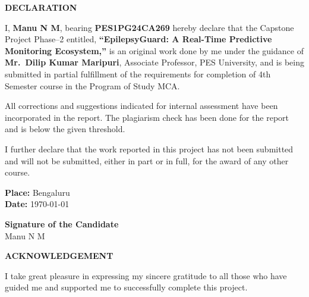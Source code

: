 \documentclass[12pt, a4paper, oneside]{report}
\begin{document}
\newpage
\begin{center}
    {\Large \textbf{DECLARATION} \par}
    \vspace{1.5cm}
\end{center}
\noindent I, \textbf{Manu N M}, bearing \textbf{PES1PG24CA269} hereby declare that the Capstone Project Phase--2 entitled, \textbf{``EpilepsyGuard: A Real-Time Predictive Monitoring Ecosystem,''} is an original work done by me under the guidance of \textbf{Mr.\ Dilip Kumar Maripuri}, Associate Professor, PES University, and is being submitted in partial fulfillment of the requirements for completion of 4th Semester course in the Program of Study MCA.

\vspace{0.8cm}
\noindent All corrections and suggestions indicated for internal assessment have been incorporated in the report. The plagiarism check has been done for the report and is below the given threshold.

\vspace{0.8cm}
\noindent I further declare that the work reported in this project has not been submitted and will not be submitted, either in part or in full, for the award of any other course.

\vspace{3cm}
\noindent
\begin{minipage}[t]{0.5\textwidth}
    \textbf{Place:} Bengaluru \\
    \textbf{Date:} \today
\end{minipage}
\hfill
\begin{minipage}[t]{0.4\textwidth}
    \raggedleft
    \textbf{Signature of the Candidate} \\
    Manu N M
\end{minipage}

\newpage
\begin{center}
    {\Large \textbf{ACKNOWLEDGEMENT} \par}
    \vspace{1.5cm}
\end{center}

\noindent I take great pleasure in expressing my sincere gratitude to all those who have guided me and supported me to successfully complete this project.
\end{document}
